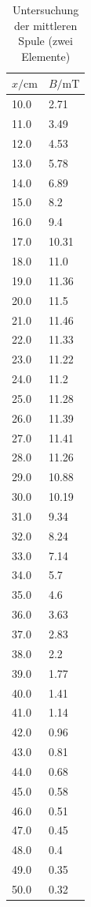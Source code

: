 \documentclass[11pt,ngerman,a4paper]{article}
\begin{document}
\begin{table}[H]
\centering
\begin{tabular}{ll}
\toprule
{$x / \si{\centi\meter}$} &{ $B/\si{\milli\tesla}$ }\\
\midrule
10.0 & 2.71\\
11.0 & 3.49\\
12.0 & 4.53\\
13.0 & 5.78\\
14.0 & 6.89\\
15.0 & 8.2\\
16.0 & 9.4\\
17.0 & 10.31\\
18.0 & 11.0\\
19.0 & 11.36\\
20.0 & 11.5\\
21.0 & 11.46\\
22.0 & 11.33\\
23.0 & 11.22\\
24.0 & 11.2\\
25.0 & 11.28\\
26.0 & 11.39\\
27.0 & 11.41\\
28.0 & 11.26\\
29.0 & 10.88\\
30.0 & 10.19\\
31.0 & 9.34\\
32.0 & 8.24\\
33.0 & 7.14\\
34.0 & 5.7\\
35.0 & 4.6\\
36.0 & 3.63\\
37.0 & 2.83\\
38.0 & 2.2\\
39.0 & 1.77\\
40.0 & 1.41\\
41.0 & 1.14\\
42.0 & 0.96\\
43.0 & 0.81\\
44.0 & 0.68\\
45.0 & 0.58\\
46.0 & 0.51\\
47.0 & 0.45\\
48.0 & 0.4\\
49.0 & 0.35\\
50.0 & 0.32\\
\bottomrule
\end{tabular}
\label{}
\caption{Untersuchung der mittleren Spule (zwei Elemente)}
\end{table}
\end{document}
